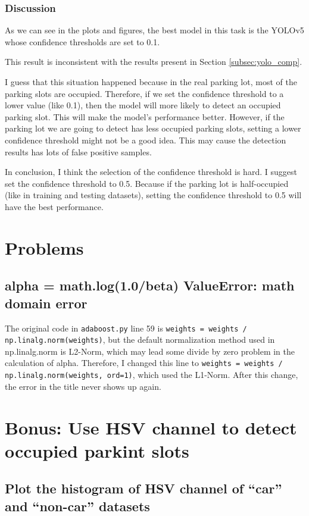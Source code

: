 \documentclass{article}[12pt]
\begin{document}
\subsubsection{Discussion}

As we can see in the plots and figures, the best model in this task is
the YOLOv5 whose confidence thresholds are set to 0.1.

This result is inconsistent with the results present in Section \ref{subsec:yolo_comp}. 

I guess that this situation happened because in the real parking lot, 
most of the parking slots are occupied. 
Therefore, if we set the confidence threshold to a lower value (like 0.1), then the model 
will more likely to detect an occupied parking slot. This will make the model's performance better.
However, if the parking lot we are going to detect has less occupied parking slots,
setting a lower confidence threshold might not be a good idea. This may cause the detection results 
has lots of false positive samples.

In conclusion, I think the selection of the confidence threshold is hard. I suggest set
the confidence threshold to 0.5. Because if the parking lot is half-occupied (like in training 
and testing datasets), setting the confidence threshold to 0.5 will have the best performance.


\section{Problems}
\subsection{alpha = math.log(1.0/beta) ValueError: math domain error}
The original code in \texttt{adaboost.py} line 59 is 
\texttt{weights = weights / np.linalg.norm(weights)},
but the default normalization method used in np.linalg.norm is L2-Norm, 
which may lead some divide by zero problem in the calculation of alpha.
Therefore, I changed this line to \texttt{weights = weights / np.linalg.norm(weights, ord=1)}, 
which used the L1-Norm. After this change, the error in the title never shows up again.

\section{Bonus: Use HSV channel to detect occupied parkint slots}

\subsection{Plot the histogram of HSV channel of ``car'' and ``non-car'' datasets}
\end{document}
